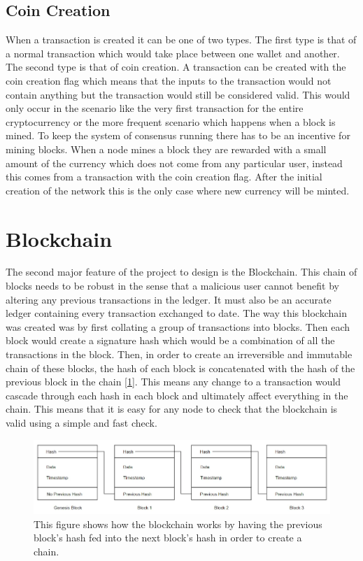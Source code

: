 \documentclass{l4proj}
\begin{document}
\subsection{Coin Creation}
When a transaction is created it can be one of two types. The first type is that of a normal transaction which would take place
between one wallet and another. The second type is that of coin creation. A transaction can be created with the 
coin creation flag which means that the inputs to the transaction would not contain anything but the transaction
would still be considered valid. This would only occur in the scenario like the very first transaction for the entire
cryptocurrency or the more frequent scenario which happens when a block is mined. To keep the system of consensus 
running there has to be an incentive for mining blocks. When a node mines a block they are rewarded with a small
amount of the currency which does not come from any particular user, instead this comes from a transaction with the
coin creation flag. After the initial creation of the network this is the only case where new currency will be
minted.

\section{Blockchain}
The second major feature of the project to design is the Blockchain. This chain of blocks needs to be robust in
the sense that a malicious user cannot benefit by altering any previous transactions in the ledger. It must
also be an accurate ledger containing every transaction exchanged to date. The way this blockchain was created was
by first collating a group of transactions into blocks. Then each block would create a signature hash which would
be a combination of all the transactions in the block. Then, in order to create an irreversible and immutable chain
of these blocks, the hash of each block is concatenated with the hash of the previous block in the chain [\ref{fig:blockchainDiagram}]. This means
any change to a transaction would cascade through each hash in each block and ultimately affect everything in the
chain. This means that it is easy for any node to check that the blockchain is valid using a simple and fast check.

\begin{figure}[!ht]
    \centering
    \includegraphics[width=1\linewidth]{images/blockchaindiagram.png}    

    \caption{
        This figure shows how the blockchain works by having the previous block's hash fed into the next
        block's hash in order to create a chain.
    }

    \label{fig:blockchainDiagram} 
\end{figure}
\end{document}
